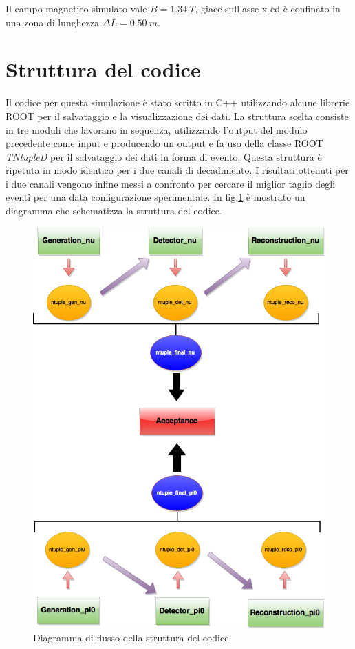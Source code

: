 \documentclass[8pt]{extarticle}
\begin{document}
Il campo magnetico simulato vale $B = 1.34\ T$, giace sull'asse x ed è confinato in una zona di lunghezza $\Delta L = 0.50\ m$.

\section{Struttura del codice} \label{sec:struttura}
Il codice per questa simulazione è stato scritto in C++ utilizzando alcune librerie ROOT per il salvataggio e la visualizzazione dei dati. 
La struttura scelta consiste in tre moduli che lavorano in sequenza, utilizzando l'output del modulo precedente come input e producendo un output e fa uso della classe ROOT \textit{TNtupleD} per il salvataggio dei dati in forma di evento. Questa struttura è ripetuta in modo identico per i due canali di decadimento. I risultati ottenuti per i due canali vengono infine messi a confronto per cercare il miglior taglio degli eventi per una data configurazione sperimentale. In fig.\ref{fig:structure} è mostrato un diagramma che schematizza la struttura del codice. 

\begin{figure}
\begin{center}
\includegraphics[scale=0.4]{structure_rare}
\caption{Diagramma di flusso della struttura del codice.}
\label{fig:structure}
\end{center}
\end{figure}
\end{document}
